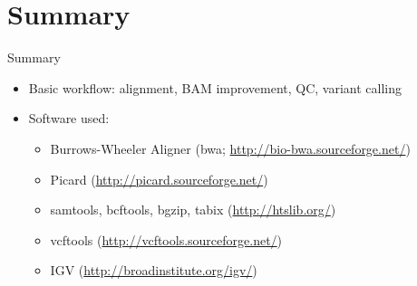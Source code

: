 \documentclass{beamer}
\begin{document}
\section*{Summary}

\begin{frame}{Summary}

  \begin{itemize}
  \item
    Basic workflow: alignment, BAM improvement, QC, variant calling
  \item
    Software used: 
    \begin{itemize}
    \item Burrows-Wheeler Aligner (bwa; \url{http://bio-bwa.sourceforge.net/}) %
    \item Picard (\url{http://picard.sourceforge.net/})
    \item samtools, bcftools, bgzip, tabix (\url{http://htslib.org/})
    \item vcftools (\url{http://vcftools.sourceforge.net/})
    \item IGV (\url{http://broadinstitute.org/igv/})
    \end{itemize}
  \end{itemize}
  
\end{frame}
\end{document}
